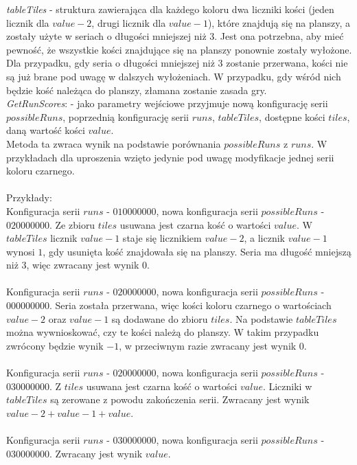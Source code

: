 \emph{tableTiles} - struktura zawierająca dla każdego koloru dwa liczniki kości (jeden licznik dla $value-2$, drugi licznik dla $value-1$), które znajdują się na planszy, a zostały użyte w seriach o długości mniejszej niż $3$. Jest ona potrzebna, aby mieć pewność, że wszystkie kości znajdujące się na planszy ponownie zostały wyłożone. Dla przypadku, gdy seria o długości mniejszej niż $3$ zostanie przerwana, kości nie są już brane pod uwagę w dalszych wyłożeniach. W przypadku, gdy wśród nich będzie kość należąca do planszy, złamana zostanie zasada gry. \\

\emph{GetRunScores}: - jako parametry wejściowe przyjmuje nową konfigurację serii $possibleRuns$, poprzednią konfigurację serii $runs$, $tableTiles$, dostępne kości $tiles$, daną wartość kości $value$.  \\
Metoda ta zwraca wynik na podstawie porównania $possibleRuns$ z $runs$. W przykładach dla uproszenia wzięto jedynie pod uwagę modyfikacje jednej serii koloru czarnego.\\ \\
Przykłady: \\
Konfiguracja serii $runs$ - $010000000$, nowa konfiguracja serii $possibleRuns$ - $020000000$. Ze zbioru $tiles$ usuwana jest czarna kość o wartości $value$. W $tableTiles$ licznik $value-1$ staje się licznikiem $value-2$, a licznik $value-1$ wynosi $1$, gdy usunięta kość znajdowała się na planszy. Seria ma długość mniejszą niż 3, więc zwracany jest wynik $0$. \\ \\
Konfiguracja serii $runs$ - $020000000$, nowa konfiguracja serii $possibleRuns$ - $000000000$.
Seria została przerwana, więc kości koloru czarnego o wartościach $value-2$ oraz $value-1$ są dodawane do zbioru $tiles$. Na podstawie $tableTiles$ można wywnioskować, czy te kości należą do planszy. W takim przypadku zwrócony będzie wynik $-1$, w przeciwnym razie zwracany jest wynik $0$. \\ \\
Konfiguracja serii $runs$ - $020000000$, nowa konfiguracja serii $possibleRuns$ - $030000000$.
Z $tiles$ usuwana jest czarna kość o wartości $value$. Liczniki w $tableTiles$ są zerowane z powodu zakończenia serii. Zwracany jest wynik $value-2 + value-1 + value$. \\ \\
Konfiguracja serii $runs$ - $030000000$, nowa konfiguracja serii $possibleRuns$ - $030000000$.
Zwracany jest wynik $value$. \\ \\

